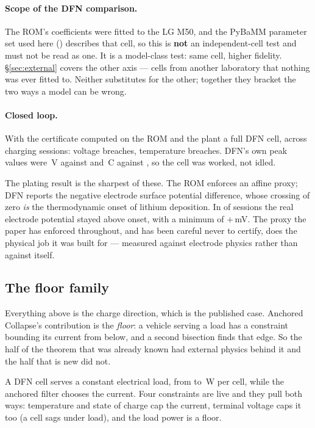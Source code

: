\documentclass[11pt,letterpaper]{article}
\theoremstyle{definition}
\theoremstyle{remark}
\newcommand{\SI}[2]{#1\,#2}
\newcommand{\degreeCelsius}{\degC}
\newcommand{\degC}{\ifmmode{^\circ}\mathrm{C}\else\textdegree C\fi}
\begin{document}
\paragraph{Scope of the DFN comparison.} The ROM's coefficients were fitted to the LG M50, and the
PyBaMM parameter set used here (\dSet) describes that cell, so this is \textbf{not} an
independent-cell test and must not be read as one. It is a model-class test: same cell, higher
fidelity. \S\ref{sec:external} covers the other axis --- \nCells{} cells from another laboratory
that nothing was ever fitted to. Neither substitutes for the other; together they bracket the two
ways a model can be wrong.


\paragraph{Closed loop.} With the certificate computed on the ROM and the plant a full DFN cell,
across \dSessions{} charging sessions: \dViolV{} voltage breaches, \dViolT{} temperature
breaches. DFN's own peak values were \dPeakV\,V against \dVmaxLim{} and \SI{\dPeakT}{\degreeCelsius} against
\dTmaxLim, so the cell was worked, not idled.

The plating result is the sharpest of these. The ROM enforces an affine proxy; DFN reports the
negative electrode surface potential difference, whose crossing of zero \emph{is} the
thermodynamic onset of lithium deposition. In \dPlateClean{} of \dSessions{} sessions the real
electrode potential stayed above onset, with a minimum of $+$\dMinPhi\,mV. The proxy the paper has
enforced throughout, and has been careful never to certify, does the physical job it was built
for --- measured against electrode physics rather than against itself.


\subsection{The floor family}\label{sec:dfndischarge}

Everything above is the charge direction, which is the published case. Anchored Collapse's
contribution is the \emph{floor}: a vehicle serving a load has a constraint bounding its current
from below, and a second bisection finds that edge. So the half of the theorem that was already
known had external physics behind it and the half that is new did not.

A DFN cell serves a constant electrical load, from \dcLoadLo{} to \dcLoadHi\,W per cell, while
the anchored filter chooses the current. Four constraints are live and they pull both ways:
temperature and state of charge cap the current, terminal voltage caps it too (a cell sags under
load), and the load power is a floor.
\end{document}

